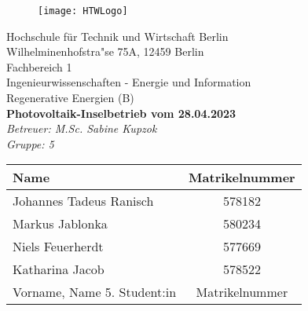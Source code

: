 \begin{titlepage}

		\begin{figure}[h] 
				\begin{flushright}
			\texttt{[image: HTWLogo]}\\
				\end{flushright}
		\end{figure}
		
	\begin{center}
		\vspace*{\fill}
		{\Large Hochschule f{\"u}r Technik und Wirtschaft Berlin}\\
			\bigskip
			Wilhelminenhofstra"se 75A, 12459 Berlin\\
			\bigskip
		Fachbereich 1 \\Ingenieurwissenschaften - Energie und Information\\Regenerative Energien (B)\\
		\vfill
		 \textcolor{HTWGreen}{\textbf{\Large{Photovoltaik-Inselbetrieb vom 28.04.2023}}}\\
		\textit{Betreuer: M.Sc. Sabine Kupzok}\\
		\textit{Gruppe: 5}\\
	\vfill
	\end{center}
\vfill
\begin{table}[H]
			\centering
			\begin{tabular}{|l|c|}
			\hline
			\rowcolor[cmyk]{0.55, 0.00, 1.00, 0.00} \textbf{Name} & \textbf{Matrikelnummer}  \\
			\hline
			Johannes Tadeus Ranisch     & 578182\\
			\hline
			Markus Jablonka       & 580234\\
			\hline
			Niels Feuerherdt      & 577669\\
			\hline
			Katharina Jacob 			 & 578522\\
			\hline
			Vorname, Name  5. Student:in			 & Matrikelnummer\\
			\hline
			\end{tabular}
			\end{table}
\end{titlepage}
